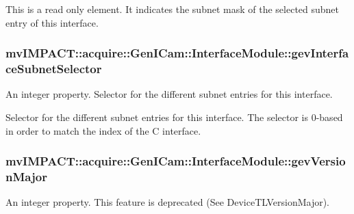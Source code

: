 This is a read only element. It indicates the subnet mask of the selected subnet entry of this interface. \hypertarget{classmv_i_m_p_a_c_t_1_1acquire_1_1_gen_i_cam_1_1_interface_module_aeea840be72dd655aaca87367456708b8}{
\subsubsection[{gev\+Interface\+Subnet\+Selector}]{ mv\+I\+M\+P\+A\+C\+T\+::acquire\+::\+Gen\+I\+Cam\+::\+Interface\+Module\+::gev\+Interface\+Subnet\+Selector}}\label{classmv_i_m_p_a_c_t_1_1acquire_1_1_gen_i_cam_1_1_interface_module_aeea840be72dd655aaca87367456708b8}


An integer property. Selector for the different subnet entries for this interface. 

Selector for the different subnet entries for this interface. The selector is 0-\/based in order to match the index of the C interface. \hypertarget{classmv_i_m_p_a_c_t_1_1acquire_1_1_gen_i_cam_1_1_interface_module_a7b2757e3dd747f119af3ad583dbf2aa8}{
\subsubsection[{gev\+Version\+Major}]{ mv\+I\+M\+P\+A\+C\+T\+::acquire\+::\+Gen\+I\+Cam\+::\+Interface\+Module\+::gev\+Version\+Major}}\label{classmv_i_m_p_a_c_t_1_1acquire_1_1_gen_i_cam_1_1_interface_module_a7b2757e3dd747f119af3ad583dbf2aa8}


An integer property. This feature is deprecated (See Device\+T\+L\+Version\+Major). 

